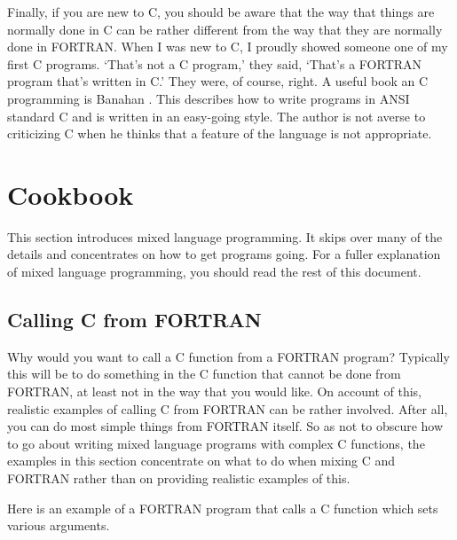 Finally, if you are new to C, you should be aware that the way that things are
normally done in C can be rather different from the way that they are normally
done in FORTRAN. When I was new to C, I proudly showed someone one of my first
C programs. `That's not a C program,' they said,  `That's a FORTRAN program
that's written in C.' They were, of course, right. A useful book an C
programming is Banahan \cite{Banahan}. This describes how to write programs in
ANSI standard C and is written in an easy-going style. The author is not averse
to criticizing C when he thinks that a feature of the language is not
appropriate.

\section{Cookbook}

This section introduces mixed language programming. It skips over many of the
details and concentrates on how to get programs going. For a fuller explanation
of mixed language programming, you should read the rest of this document.

\subsection{Calling C from FORTRAN}

Why would you want to call a C function from a FORTRAN program? Typically this
will be to do something in the C function that cannot be done from FORTRAN, at
least not in the way that you would like. On account of this, realistic
examples of calling C from FORTRAN can be rather involved. After all, you can
do most simple things from FORTRAN itself. So as not to obscure how to go about
writing mixed language programs with complex C functions, the examples in this
section concentrate on what to do when mixing C and FORTRAN rather than on
providing realistic examples of this.

Here is an example of a FORTRAN program that calls a C function which sets
various arguments.


